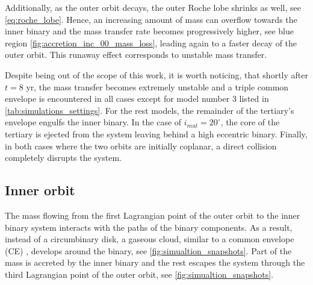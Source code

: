 Additionally, as the outer orbit decays, the outer Roche lobe shrinks as well, see \cref{eq:roche_lobe}. Hence, an increasing amount of mass can overflow towards the inner binary and the mass transfer rate becomes progressively higher, see blue region \cref{fig:accretion_inc_00_mass_loss}, leading again to a faster decay of the outer orbit. This runaway effect corresponds to unstable mass transfer.

Despite being out of the scope of this work, it is worth noticing, that shortly after $t=8$ yr, the mass transfer becomes extremely unstable and a triple common envelope is encountered in all cases except for model number 3 listed in \cref{tab:simulations_settings}. For the rest models, the remainder of the tertiary's envelope engulfs the inner binary. In the case of $i_{mut} = 20^{\circ}$, the core of the tertiary is ejected from the system leaving behind a high eccentric binary. Finally, in both cases where the two orbits are initially coplanar, a direct collision completely disrupts the system.

\subsection{Inner orbit}

The mass flowing from the first Lagrangian point of the outer orbit to the inner binary system interacts with the paths of the binary components. As a result, instead of a circumbinary disk, a gaseous cloud, similar to a common envelope (CE) \citep{ivanova2013common}, develops around the binary, see \cref{fig:simualtion_snapshots}.  Part of the mass is accreted by the inner binary and the rest escapes the system through the third Lagrangian point of the outer orbit, see \cref{fig:simualtion_snapshots}. 

